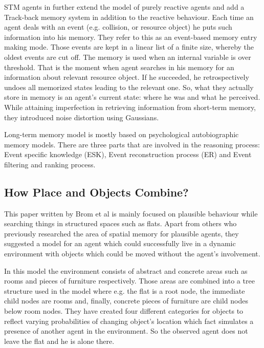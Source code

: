 STM agents in \cite{Ho:memoryarchitectures} further extend the model of purely reactive agents and add a Track-back memory system in addition to the reactive behaviour. Each time an agent deals with an event (e.g. collision, or resource object) he puts such information into his memory. They refer to this as an event-based memory entry making mode. Those events are kept in a linear list of a finite size, whereby the oldest events are cut off. The memory is used when an internal variable is over threshold. That is the moment when agent searches in his memory for an information about relevant resource object. If he succeeded, he retrospectively undoes all memorized states leading to the relevant one. So, what they actually store in memory is an agent’s current state: where he was and what he perceived. While attaining imperfection in retrieving information from short-term memory, they introduced noise distortion using Gaussians.

Long-term memory model is mostly based on psychological autobiographic memory models. There are three parts that are involved in the reasoning process: Event specific knowledge (ESK), Event reconstruction process (ER) and Event filtering and ranking process.

\subsection{How Place and Objects Combine?}

This paper written by Brom et al \cite{Brom:placeandobjects} is mainly focused on plausible behaviour while searching things in structured spaces such as flats. Apart from others who previously researched the area of spatial memory for plausible agents, they suggested a model for an agent which could successfully live in a dynamic environment with objects which could be moved without the agent’s involvement. 

In this model the environment consists of abstract and concrete areas such as rooms and pieces of furniture respectively. Those areas are combined into a tree structure used in the model where e.g. the flat is a root node, the immediate child nodes are rooms and, finally, concrete pieces of furniture are child nodes below room nodes. They have created four different categories for objects to reflect varying probabilities of changing object’s location which fact simulates a presence of another agent in the environment. So the observed agent does not leave the flat and he is alone there.

